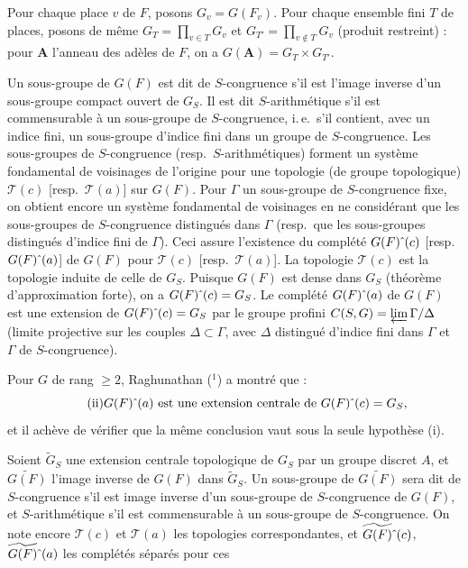\documentclass[11pt]{amsart}
\theoremstyle{plain}
\theoremstyle{definition}
\begin{document}
Pour chaque place $v$ de $F$, posons $G_v=G(F_v)$. Pour chaque ensemble fini $T$ de places, posons de m\^eme $G_T=\prod_{v\in T} G_v$ et $G_{T'}=\prod_{v\notin T} G_v$ (produit restreint) : pour $\mathbf{A}$ l'anneau des ad\`eles de $F$, on a $G(\mathbf{A})=G_T\times G_{T'}$.

Un sous-groupe de $G(F)$ est dit de $S$-congruence s'il est l'image inverse d'un sous-groupe compact ouvert de $G_S$. Il est dit $S$-arithm\'etique s'il est commensurable \`a un sous-groupe de $S$-congruence, i.\,e.\ s'il contient, avec un indice fini, un sous-groupe d'indice fini dans un groupe de $S$-congruence. Les sous-groupes de $S$-congruence (resp.\ $S$-arithm\'etiques) forment un syst\`eme fondamental de voisinages de l'origine pour une topologie (de groupe topologique) $\mathscr{T}(c)$ [resp.\ $\mathscr{T}(a)$] sur $G(F)$. Pour $\Gamma$ un sous-groupe de $S$-congruence fixe, on obtient encore un syst\`eme fondamental de voisinages en ne consid\'erant que les sous-groupes de $S$-congruence distingu\'es dans $\Gamma$ (resp.\ que les sous-groupes distingu\'es d'indice fini de $\Gamma$). Ceci assure l'existence du compl\'et\'e $G(F)\hat{\mkern6mu}(c)$ [resp.\ $G(F)\hat{\mkern6mu}(a)$] de $G(F)$ pour $\mathscr{T}(c)$ [resp.\ $\mathscr{T}(a)$]. La topologie $\mathscr{T}(c)$ est la topologie induite de celle de $G_S$. Puisque $G(F)$ est dense dans $G_S$ (th\'eor\`eme d'approximation forte), on a $G(F)\hat{\mkern6mu}(c)=G_S$. Le compl\'et\'e $G(F)\hat{\mkern6mu}(a)$ de $G(F)$ est une extension de $G(F)\hat{\mkern6mu}(c)=G_S$ par le groupe profini $C(S,G)=\varprojlim \Gamma/\Delta$ (limite projective sur les couples $\Delta\subset\Gamma$, avec $\Delta$ distingu\'e d'indice fini dans $\Gamma$ et $\Gamma$ de $S$-congruence).

Pour $G$ de rang $\ge 2$, Raghunathan ($^1$) a montr\'e que :
\begin{equation}\tag{ii}
\text{$G(F)\hat{\mkern6mu}(a)$ est une extension centrale de $G(F)\hat{\mkern6mu}(c)=G_S$,}
\end{equation}
et il ach\`eve de v\'erifier que la m\^eme conclusion vaut sous la seule hypoth\`ese (i).

Soient $\widetilde{G}_S$ une extension centrale topologique de $G_S$ par un groupe discret $A$, et $\widetilde{G(F)}$ l'image inverse de $G(F)$ dans $\widetilde{G}_S$. Un sous-groupe de $\widetilde{G(F)}$ sera dit de $S$-congruence s'il est image inverse d'un sous-groupe de $S$-congruence de $G(F)$, et $S$-arithm\'etique s'il est commensurable \`a un sous-groupe de $S$-congruence. On note encore $\mathscr{T}(c)$ et $\mathscr{T}(a)$ les topologies correspondantes, et $\widetilde{G(F)}\hat{\mkern6mu}(c)$, $\widetilde{G(F)}\hat{\mkern6mu}(a)$ les compl\'et\'es s\'epar\'es pour ces
\end{document}
